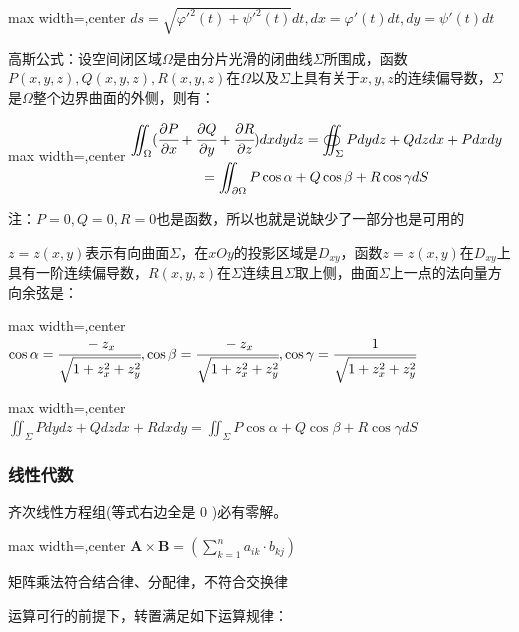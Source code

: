\documentclass[twocolumn,10pt]{ctexart}
\begin{document}
\begin{adjustbox}{max width=\linewidth,center}
$ds=\sqrt{\varphi'^2(t)+\psi'^2(t)}dt,dx=\varphi'(t)dt,dy=\psi'(t)dt$
\end{adjustbox}

高斯公式：设空间闭区域$\Omega$是由分片光滑的闭曲线$\Sigma$所围成，函数$P(x,y,z),Q(x,y,z),R(x,y,z)$在$\Omega$以及$\Sigma$上具有关于$x,y,z$的连续偏导数，$\Sigma$是$\Omega$整个边界曲面的外侧，则有：

\begin{adjustbox}{max width=\linewidth,center}
$\begin{gathered}
\iint_\Omega(\cfrac{\partial P}{\partial x}+\cfrac{\partial Q}{\partial y}+\cfrac{\partial R}{\partial z})dxdydz=\oiint_\Sigma Pdydz+Qdzdx+Pdxdy
\\=\iint_{\partial\Omega}P\cos\alpha+Q\cos\beta+R\cos\gamma dS
\end{gathered}$
\end{adjustbox}

注：$P=0,Q=0,R=0$也是函数，所以也就是说缺少了一部分也是可用的

$z=z(x,y)$表示有向曲面$\Sigma$，在$xOy$的投影区域是$D_{xy}$，函数$z=z(x,y)$在$D_{xy}$上具有一阶连续偏导数，$R(x,y,z)$在$\Sigma$连续且$\Sigma$取上侧，曲面$\Sigma$上一点的法向量方向余弦是：

\begin{adjustbox}{max width=\linewidth,center}
$\cos\alpha=\cfrac{-z_x}{\sqrt{1+z^2_x+z^2_y}},
\cos\beta=\cfrac{-z_x}{\sqrt{1+z^2_x+z^2_y}},
\cos\gamma=\cfrac{1}{\sqrt{1+z^2_x+z^2_y}}$
\end{adjustbox}

\begin{adjustbox}{max width=\linewidth,center}
$\iint_\Sigma Pdydz+Qdzdx+Rdxdy=\iint_\Sigma P\cos\alpha+Q\cos\beta+R\cos\gamma dS$
\end{adjustbox}

\subsubsection{线性代数}

齐次线性方程组(等式右边全是 $0$ )必有零解。

\begin{adjustbox}{max width=\linewidth,center}
$\mathbf{A}\times\mathbf{B}=(\sum_{k=1}^na_{ik}\cdot b_{kj})$
\end{adjustbox}

矩阵乘法符合结合律、分配律，不符合交换律

运算可行的前提下，转置满足如下运算规律：
\end{document}
